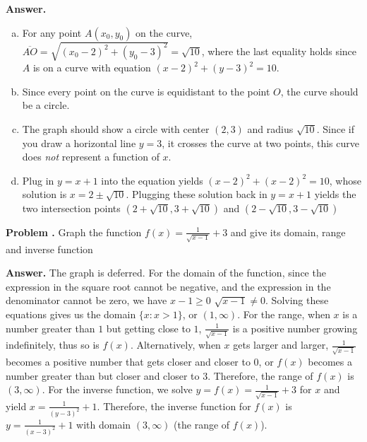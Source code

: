 \documentclass[11pt,letterpaper]{article}
\newcounter{problem}
\newcommand{\problem}{
	\stepcounter{problem}%
	\noindent \textbf{Problem \theproblem. }%
}
\newcommand{\answer}{\noindent \textbf{Answer. }}
\begin{document}
\answer

\begin{enumerate}[(a)]
    \item For any point $A(x_0, y_0)$ on the curve, $\overline{AO} = \sqrt{(x_0-2)^2+(y_0-3)^2} = \sqrt{10}$, where the last equality holds since $A$ is on a curve with equation $(x-2)^2+(y-3)^2 = 10$.
    \item Since every point on the curve is equidistant to the point $O$, the curve should be a circle.
    \item The graph should show a circle with center $(2,3)$ and radius $\sqrt{10}$.  Since if you draw a horizontal line $y=3$, it crosses the curve at two points, this curve does \textit{not} represent a function of $x$.
    \item Plug in $y=x+1$ into the equation yields $(x-2)^2+(x-2)^2 = 10$, whose solution is $x=2 \pm \sqrt{10}$. Plugging these solution back in $y=x+1$ yields the two intersection points $(2+\sqrt{10}, 3+\sqrt{10})$ and $(2-\sqrt{10}, 3-\sqrt{10})$
\end{enumerate} \vspace{6mm}


\problem Graph the function $f(x) = \frac{1}{\sqrt{x-1}} + 3$ and give its domain, range and inverse function \vspace{6mm}

\answer The graph is deferred.  For the domain of the function, since the expression in the square root cannot be negative, and the expression in the denominator cannot be zero, we have $x-1 \ge 0$  $\sqrt{x-1} \ne 0$.  Solving these equations gives us the domain $\{x: x > 1\}$, or $(1,\infty)$.  For the range, when $x$ is a number greater than $1$ but getting close to $1$, $\frac{1}{\sqrt{x-1}}$ is a positive number growing indefinitely, thus so is $f(x)$.  Alternatively, when $x$ gets larger and larger, $\frac{1}{\sqrt{x-1}}$ becomes a  positive number that gets closer and closer to $0$, or $f(x)$ becomes a number greater than but closer and closer to $3$.  Therefore, the range of $f(x)$ is $(3, \infty)$.  For the inverse function, we solve $y=f(x)=\frac{1}{\sqrt{x-1}}+3$ for $x$ and yield $x = \frac{1}{(y-3)^2}+1$.  Therefore, the inverse function for $f(x)$ is $y=\frac{1}{(x-3)^2}+1$ with domain $(3, \infty)$ (the range of $f(x)$).
\end{document}
